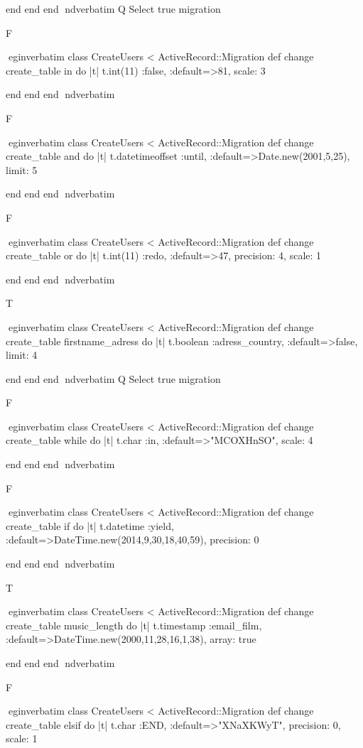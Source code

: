     end 
  end 
end
nd{verbatim}
Q
 Select true migration

F

egin{verbatim}
 class CreateUsers < ActiveRecord::Migration 
  def change 
    create_table in do |t| 
      t.int(11) :false, :default=>81, scale: 3
    
    end 
  end 
end
nd{verbatim}

F

egin{verbatim}
 class CreateUsers < ActiveRecord::Migration 
  def change 
    create_table and do |t| 
      t.datetimeoffset :until, :default=>Date.new(2001,5,25), limit: 5
    
    end 
  end 
end
nd{verbatim}

F

egin{verbatim}
 class CreateUsers < ActiveRecord::Migration 
  def change 
    create_table or do |t| 
      t.int(11) :redo, :default=>47, precision: 4, scale: 1
    
    end 
  end 
end
nd{verbatim}

T

egin{verbatim}
 class CreateUsers < ActiveRecord::Migration 
  def change 
    create_table firstname_adress do |t| 
      t.boolean :adress_country, :default=>false, limit: 4
    
    end 
  end 
end
nd{verbatim}
Q
 Select true migration

F

egin{verbatim}
 class CreateUsers < ActiveRecord::Migration 
  def change 
    create_table while do |t| 
      t.char :in, :default=>"MCOXHnSO", scale: 4
    
    end 
  end 
end
nd{verbatim}

F

egin{verbatim}
 class CreateUsers < ActiveRecord::Migration 
  def change 
    create_table if do |t| 
      t.datetime :yield, :default=>DateTime.new(2014,9,30,18,40,59), precision: 0
    
    end 
  end 
end
nd{verbatim}

T

egin{verbatim}
 class CreateUsers < ActiveRecord::Migration 
  def change 
    create_table music_length do |t| 
      t.timestamp :email_film, :default=>DateTime.new(2000,11,28,16,1,38), array: true
    
    end 
  end 
end
nd{verbatim}

F

egin{verbatim}
 class CreateUsers < ActiveRecord::Migration 
  def change 
    create_table elsif do |t| 
      t.char :END, :default=>"XNaXKWyT", precision: 0, scale: 1
    
